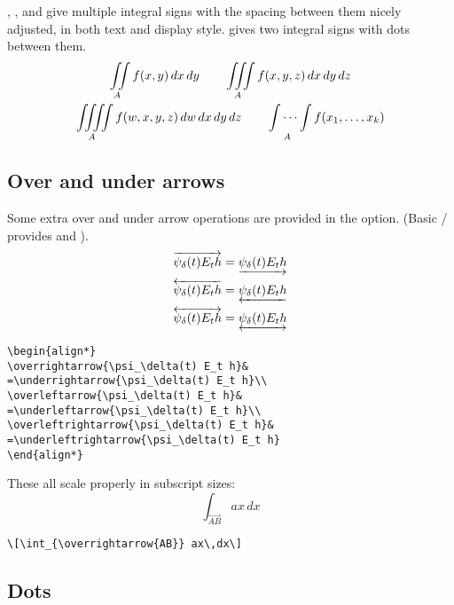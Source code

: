 , , and  give multiple integral signs
with the spacing between them nicely adjusted,  in both text and
display style.   gives two integral signs with dots
between them.
\begin{gather}
\iint\limits_A f(x,y)\,dx\,dy\qquad\iiint\limits_A
f(x,y,z)\,dx\,dy\,dz\\
\iiiint\limits_A
f(w,x,y,z)\,dw\,dx\,dy\,dz\qquad\idotsint\limits_A f(x_1,\dots,x_k)
\end{gather}

\subsection{Over and under arrows}

Some extra over and under arrow operations are provided in
the  option.  (Basic \latex/ provides
 and ).
\begin{align*}
\overrightarrow{\psi_\delta(t) E_t h}&
=\underrightarrow{\psi_\delta(t) E_t h}\\
\overleftarrow{\psi_\delta(t) E_t h}&
=\underleftarrow{\psi_\delta(t) E_t h}\\
\overleftrightarrow{\psi_\delta(t) E_t h}&
=\underleftrightarrow{\psi_\delta(t) E_t h}
\end{align*}
\begin{verbatim}
\begin{align*}
\overrightarrow{\psi_\delta(t) E_t h}&
=\underrightarrow{\psi_\delta(t) E_t h}\\
\overleftarrow{\psi_\delta(t) E_t h}&
=\underleftarrow{\psi_\delta(t) E_t h}\\
\overleftrightarrow{\psi_\delta(t) E_t h}&
=\underleftrightarrow{\psi_\delta(t) E_t h}
\end{align*}
\end{verbatim}
These all scale properly in subscript sizes:
\[\int_{\overrightarrow{AB}} ax\,dx\]
\begin{verbatim}
\[\int_{\overrightarrow{AB}} ax\,dx\]
\end{verbatim}

\subsection{Dots} 


